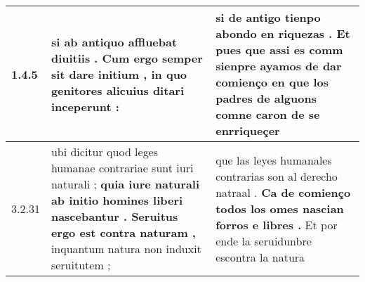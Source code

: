 \begin{tabular}{|p{1cm}|p{6.5cm}|p{6.5cm}|}

\hline
1.4.5 & si ab antiquo affluebat diuitiis . \textbf{ Cum ergo semper sit dare initium , } in quo genitores alicuius ditari inceperunt : & si de antigo tienpo abondo en riquezas . \textbf{ Et pues que assi es comm sienpre ayamos de dar comienço } en que los padres de alguons comne caron de se enrriqueçer \\\hline
3.2.31 & ubi dicitur quod leges humanae contrariae sunt iuri naturali ; \textbf{ quia iure naturali ab initio homines liberi nascebantur . Seruitus ergo est contra naturam , } inquantum natura non induxit seruitutem ; & que las leyes humanales contrarias son al derecho natraal . \textbf{ Ca de comienço todos los omes nascian forros e libres . } Et por ende la seruidunbre escontra la natura \\\hline

\end{tabular}
